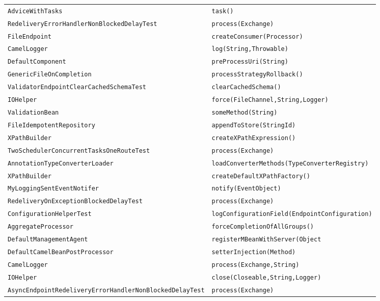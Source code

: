 \begin{center}
\begin{longtable}{ll}
\lstinline/AdviceWithTasks/&{\lstinline/task()/}\\
\lstinline/RedeliveryErrorHandlerNonBlockedDelayTest/&{\lstinline/process(Exchange)/}\\
\lstinline/FileEndpoint/&{\lstinline/createConsumer(Processor)/}\\
\lstinline/CamelLogger/&{\lstinline/log(String,Throwable)/}\\
\lstinline/DefaultComponent/&{\lstinline/preProcessUri(String)/}\\
\lstinline/GenericFileOnCompletion/&{\lstinline/processStrategyRollback()/}\\
\lstinline/ValidatorEndpointClearCachedSchemaTest/&{\lstinline/clearCachedSchema()/}\\
\lstinline/IOHelper/&{\lstinline/force(FileChannel,String,Logger)/}\\
\lstinline/ValidationBean/&{\lstinline/someMethod(String)/}\\
\lstinline/FileIdempotentRepository/&{\lstinline/appendToStore(StringId)/}\\
\lstinline/XPathBuilder/&{\lstinline/createXPathExpression()/}\\
\lstinline/TwoSchedulerConcurrentTasksOneRouteTest/&{\lstinline/process(Exchange)/}\\
\lstinline/AnnotationTypeConverterLoader/&{\lstinline/loadConverterMethods(TypeConverterRegistry)/}\\
\lstinline/XPathBuilder/&{\lstinline/createDefaultXPathFactory()/}\\
\lstinline/MyLoggingSentEventNotifer/&{\lstinline/notify(EventObject)/}\\
\lstinline/RedeliveryOnExceptionBlockedDelayTest/&{\lstinline/process(Exchange)/}\\
\lstinline/ConfigurationHelperTest/&{\lstinline/logConfigurationField(EndpointConfiguration)/}\\
\lstinline/AggregateProcessor/&{\lstinline/forceCompletionOfAllGroups()/}\\
\lstinline/DefaultManagementAgent/&{\lstinline/registerMBeanWithServer(Object/}\\
\lstinline/DefaultCamelBeanPostProcessor/&{\lstinline/setterInjection(Method)/}\\
\lstinline/CamelLogger/&{\lstinline/process(Exchange,String)/}\\
\lstinline/IOHelper/&{\lstinline/close(Closeable,String,Logger)/}\\
\lstinline/AsyncEndpointRedeliveryErrorHandlerNonBlockedDelayTest/&{\lstinline/process(Exchange)/}\\

\end{longtable}
\end{center}

